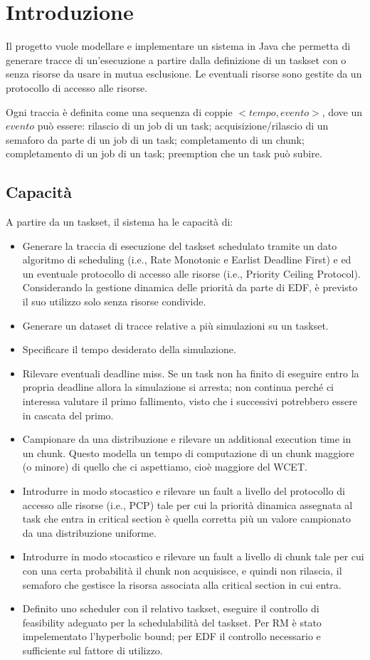 \chapter{Introduzione}
Il progetto vuole modellare e implementare un sistema in Java che permetta di generare tracce di un'esecuzione a partire dalla definizione di un taskset con o senza risorse da usare in mutua esclusione. Le eventuali risorse sono gestite da un protocollo di accesso alle risorse.

Ogni traccia è definita come una sequenza di coppie $<tempo, evento>$, dove un $evento$ può essere: rilascio di un job di un task; acquisizione/rilascio di un semaforo da parte di un job di un task; completamento di un chunk; completamento di un job di un task; preemption che un task può subire.

\section{Capacità}
A partire da un taskset, il sistema ha le capacità di:
\begin{itemize}
    \item Generare la traccia di esecuzione del taskset schedulato tramite un dato algoritmo di scheduling (i.e., Rate Monotonic e Earlist Deadline First) e ed un eventuale protocollo di accesso alle risorse (i.e., Priority Ceiling Protocol). Considerando la gestione dinamica delle priorità da parte di EDF, è previsto il suo utilizzo solo senza risorse condivide.
    \item Generare un dataset di tracce relative a più simulazioni su un taskset.
    \item Specificare il tempo desiderato della simulazione.
    \item Rilevare eventuali deadline miss. Se un task non ha finito di eseguire entro la propria deadline allora la simulazione si arresta; non continua perché ci interessa valutare il primo fallimento, visto che i successivi potrebbero essere in cascata del primo.
    \item Campionare da una distribuzione e rilevare un additional execution time in un chunk. Questo modella un tempo di computazione di un chunk maggiore (o minore) di quello che ci aspettiamo, cioè maggiore del WCET.
    \item Introdurre in modo stocastico e rilevare un fault a livello del protocollo di accesso alle risorse (i.e., PCP) tale per cui la priorità dinamica assegnata al task che entra in critical section è quella corretta più un valore campionato da una distribuzione uniforme.
    \item Introdurre in modo stocastico e rilevare un fault a livello di chunk tale per cui con una certa probabilità il chunk non acquisisce, e quindi non rilascia, il semaforo che gestisce la risorsa associata alla critical section in cui entra.
    \item Definito uno scheduler con il relativo taskset, eseguire il controllo di feasibility adeguato per la schedulabilità del taskset. Per RM è stato impelementato l'hyperbolic bound; per EDF il controllo necessario e sufficiente sul fattore di utilizzo.
\end{itemize}

